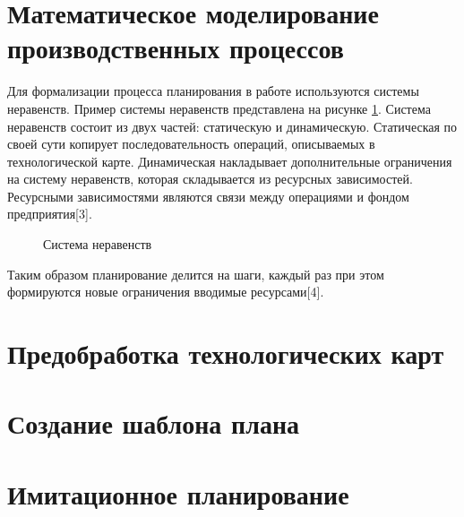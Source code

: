\section{Математическое моделирование производственных процессов}

Для формализации процесса планирования в работе используются системы неравенств. Пример системы неравенств представлена на рисунке \ref{ris:sys1}. Система неравенств состоит из двух частей: статическую и динамическую. Статическая по своей сути копирует последовательность операций, описываемых в технологической карте. Динамическая накладывает дополнительные ограничения на систему неравенств, которая складывается из ресурсных зависимостей. Ресурсными зависимостями являются связи между операциями и фондом предприятия[3].

\begin{figure}[H]
    \caption{Система неравенств}
    \label{ris:sys1}
\end{figure}

Таким образом планирование делится на шаги, каждый раз при этом формируются новые ограничения вводимые ресурсами[4].

\section{Предобработка технологических карт}

\section{Создание шаблона плана}

\section{Имитационное планирование}

